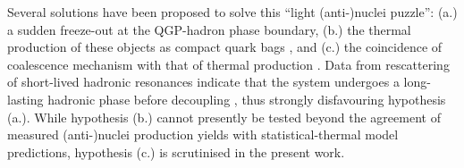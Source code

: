 \documentclass[a4paper,11pt]{scrartcl}
\begin{document}
Several solutions have been proposed to solve this ``light (anti-)nuclei puzzle'': (a.) a sudden freeze-out at the QGP-hadron phase boundary, (b.) the thermal production of these objects as compact quark bags \cite{Andronic:2017}, and (c.) the coincidence of coalescence mechanism with that of thermal production \cite{Scheibl:1998tk, HeinzTorino}. 
Data from rescattering of short-lived hadronic resonances indicate that the system undergoes a long-lasting hadronic phase before decoupling \cite{Abelev:2014uua}, thus strongly disfavouring hypothesis (a.). 
While hypothesis (b.) cannot presently be tested beyond the agreement of measured (anti-)nuclei production yields with statistical-thermal model predictions, hypothesis (c.) is scrutinised in the present work.

\begin{table}[htb]


\end{table}
\end{document}
